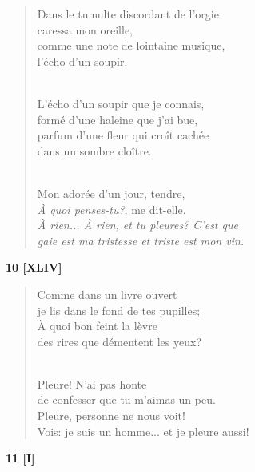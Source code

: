\documentclass[a4paper,11pt]{book}
\begin{document}
\begin{verse}
Dans le tumulte discordant de l'orgie \\
caressa mon oreille, \\
comme une note de lointaine musique, \\
l'écho d'un soupir. \\ \

L'écho d'un soupir que je connais, \\
formé d'une haleine que j'ai bue, \\
parfum d'une fleur qui croît cachée \\
dans un sombre cloître. \\ \

Mon adorée d'un jour, tendre, \\
{\em À quoi penses-tu?\/}, me dit-elle. \\
{\em À rien... À rien, et tu pleures? C'est que \\
gaie est ma tristesse et triste est mon vin.} \\
\end{verse}


\begin{center} {\bf 10 [XLIV]}  \end{center}

\begin{verse}
Comme dans un livre ouvert \\
je lis dans le fond de tes pupilles; \\
À quoi bon feint la lèvre \\
des rires que démentent les yeux? \\ \

Pleure! N'ai pas honte \\
de confesser que tu m'aimas un peu. \\
Pleure, personne ne nous voit! \\
Vois: je suis un homme... et je pleure aussi! \\
\end{verse}

\bigskip

\begin{center} {\bf 11 [I]} \end{center}
\end{document}
